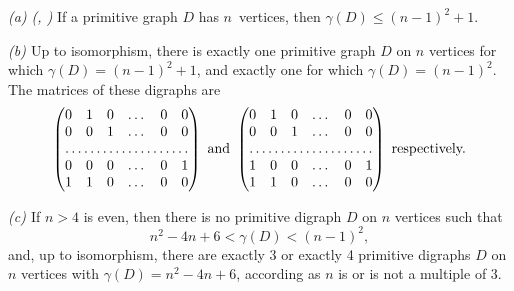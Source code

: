 \documentclass[11pt]{llncs}
\begin{document}
\begin{theorem}\label{dulmage}
\emph{(a) (\cite{Wi50,DM62}, \cite[Theorem~1]{DM64})} If a primitive graph $D$
has $n$~vertices, then  $\gamma(D)\le(n-1)^2+1$.

\emph{(b) \cite[Theorem~6 and Corollary 4]{DM64}} Up to isomorphism, there is
exactly one primitive graph $D$ on $n$ vertices for which $\gamma(D)=(n-1)^2+1$,
and exactly one for which $\gamma(D)=(n-1)^2$. The matrices of these digraphs
are
\begin{equation}
\label{wielandt}
\begin{pmatrix}
0 & 1 & 0 & \dots & 0 & 0\\
0 & 0 & 1 & \dots & 0 & 0\\
\hdotsfor{6}\\
0 & 0 & 0 & \dots & 0 & 1\\
1 & 1 & 0 & \dots & 0 & 0
\end{pmatrix} \text{ and }
\begin{pmatrix}
0 & 1 & 0 & \dots & 0 & 0\\
0 & 0 & 1 & \dots & 0 & 0\\
\hdotsfor{6}\\
1 & 0 & 0 & \dots & 0 & 1\\
1 & 1 & 0 & \dots & 0 & 0
\end{pmatrix}
\text{ respectively.}
\end{equation}

\emph{(c) \cite[Theorem~7]{DM64}} If $n>4$ is even, then there is no
primitive digraph $D$ on $n$ vertices such that
\begin{equation}
\label{even gap}
n^2-4n+6<\gamma(D)<(n-1)^2,
\end{equation}
and, up to isomorphism, there are exactly 3 or exactly 4 primitive
digraphs $D$ on $n$ vertices with $\gamma(D)=n^2-4n+6$, according
as $n$ is or is not a multiple of $3$.


\end{theorem}
\end{document}

